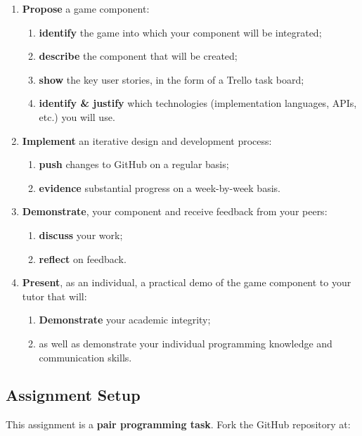 \documentclass{../fal_assignment}
\begin{document}
\begin{enumerate}[label=(\Alph*)]
    \item \textbf{Propose} a game component:
        	\begin{enumerate}[label=\roman*.]
    		\item \textbf{identify} the game into which your component will be integrated;
    		\item \textbf{describe}  the component that will be created;
		\item \textbf{show} the key user stories, in the form of a Trello task board;
		\item \textbf{identify \& justify} which technologies (implementation languages, APIs, etc.) you will use.  
	\end{enumerate}
    \item \textbf{Implement} an iterative design and development process:
    	\begin{enumerate}[label=\roman*.]
    		\item \textbf{push} changes to GitHub on a regular basis; 
		\item \textbf{evidence} substantial progress on a week-by-week basis.
	\end{enumerate}
    \item \textbf{Demonstrate}, your component and receive feedback from your peers:
    	\begin{enumerate}[label=\roman*.]
    		\item \textbf{discuss} your work;
		\item \textbf{reflect} on feedback.	
	\end{enumerate}
     \item \textbf{Present}, as an individual, a practical demo of the game component to your tutor that will:
    	\begin{enumerate}[label=\roman*.]
    		\item \textbf{Demonstrate} your academic integrity;
		\item as well as demonstrate your individual programming knowledge and communication skills.
	\end{enumerate}
\end{enumerate}    

\subsection*{Assignment Setup}

This assignment is a \textbf{pair programming task}. Fork the GitHub repository at:
\end{document}
